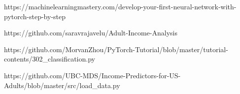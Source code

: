 \documentclass[lettersize,journal]{IEEEtran}
\begin{document}
\begin{thebibliography}{1}


 https://machinelearningmastery.com/develop-your-first-neural-network-with-pytorch-step-by-step

 https://github.com/saravrajavelu/Adult-Income-Analysis

 https://github.com/MorvanZhou/PyTorch-Tutorial/blob/master/tutorial-contents/302\_classification.py

 https://github.com/UBC-MDS/Income-Predictors-for-US-Adults/blob/master/src/load\_data.py

\end{thebibliography}
\end{document}
